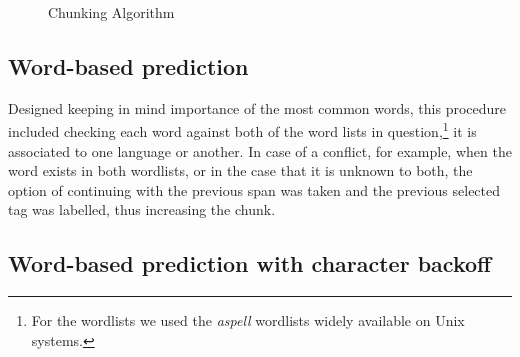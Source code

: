 \documentclass[11pt]{article}
\begin{document}
\vspace{-0.4cm}
\begin{figure}[hb]
\def\@fs@post{}
\caption{Chunking Algorithm}
\label{fig:chunkal}
\end{figure}
\vspace{-0.4cm}

\subsection{Word-based prediction}
\vspace{-0.152cm}
\label{wbased}

Designed keeping in mind importance of the most common words, this procedure included 
checking each word against both of the word lists in question,\footnote{For the wordlists we used the \emph{aspell}
wordlists widely available on Unix systems.} it is associated to one language or another. In 
case of a conflict, for example, when the word exists in both wordlists, or in the case that it is unknown to both, the option 
of continuing with the previous span was taken and the previous selected tag was labelled, thus increasing the chunk. 

\subsection{Word-based prediction with character backoff}
\vspace{-0.152cm}
\label{wbasedbackoff}
\end{document}
